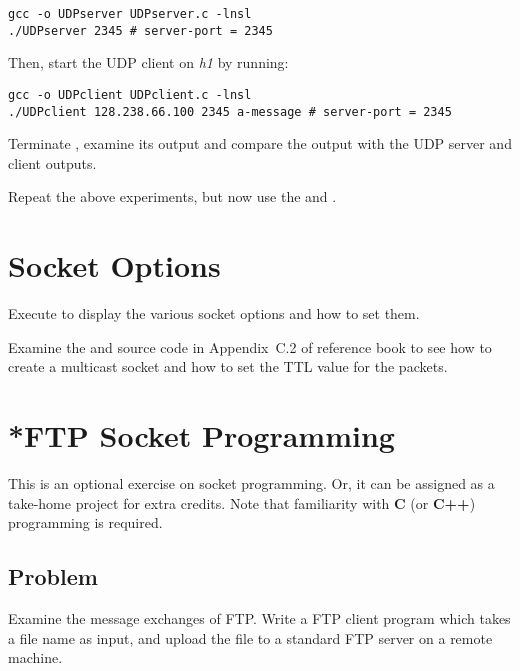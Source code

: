 \documentclass{../UTNetLab}
\begin{document}
\begin{lstlisting}[emph={server-port}]
gcc -o UDPserver UDPserver.c -lnsl
./UDPserver 2345 # server-port = 2345
\end{lstlisting}

Then, start the UDP client on \textit{h1} by running:

\begin{lstlisting}[emph={server-port, a-message}]
gcc -o UDPclient UDPclient.c -lnsl
./UDPclient 128.238.66.100 2345 a-message # server-port = 2345
\end{lstlisting}

Terminate , examine its output and compare the output with the UDP server and client outputs.

Repeat the above experiments, but now use the  and .

\section{Socket Options}
Execute  to display the various socket options and how to set them.

Examine the  and  source code in Appendix~C.2 of reference book to see how to create a multicast socket and how to set the TTL value for the packets.


\section{*FTP Socket Programming}
This is an optional exercise on socket programming.
Or, it can be assigned as a take-home project for extra credits.
Note that familiarity with \textbf{C} (or \textbf{C++}) programming is required.

\subsection*{Problem}
Examine the message exchanges of FTP.
Write a FTP client program which takes a file name as input, and upload the file to a standard FTP server on a remote machine.
\end{document}
